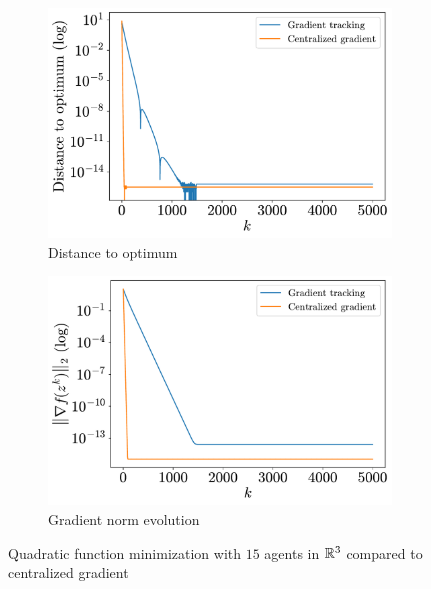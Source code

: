 \documentclass[a4paper,11pt,oneside]{book}
\begin{document}
\begin{figure}[H]
      \centering
      \begin{subfigure}[t]{0.46\linewidth}
            \centering
            \includegraphics[width=\linewidth]{./figs/quadratic/centralized/distance.pdf} 
            \caption{Distance to optimum}
      \end{subfigure}
      \hfill
      \begin{subfigure}[t]{0.46\linewidth}
            \centering
            \includegraphics[width=\linewidth]{./figs/quadratic/centralized/gradient.pdf} 
            \caption{Gradient norm evolution}
      \end{subfigure}
      \caption{Quadratic function minimization with $15$ agents in ${\mathbb{R}}^{3}$ compared to centralized gradient}
      \label{fig:quadratic_centralized_15_3}
\end{figure}
\end{document}
